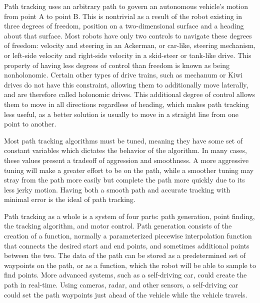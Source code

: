 \documentclass[12pt]{article}
\begin{document}
\begin{flushleft}
Path tracking uses an arbitrary path to govern an autonomous vehicle's motion from point A to point B. This is nontrivial as a result of the robot existing in three degrees of freedom, position on a two-dimensional surface and a heading about that surface. Most robots have only two controls to navigate these degrees of freedom: velocity and steering in an Ackerman, or car-like, steering mechanism, or left-side velocity and right-side velocity in a skid-steer or tank-like drive. This property of having less degrees of control than freedom is known as being nonholonomic. Certain other types of drive trains, such as mechanum or Kiwi drives do not have this constraint, allowing them to additionally move laterally, and are therefore called holonomic drives. This additional degree of control allows them to move in all directions regardless of heading, which makes path tracking less useful, as a better solution is usually to move in a straight line from one point to another.

Most path tracking algorithms must be tuned, meaning they have some set of constant variables which dictates the behavior of the algorithm. In many cases, these values present a tradeoff of aggression and smoothness. A more aggressive tuning will make a greater effort to be on the path, while a smoother tuning may stray from the path more easily but complete the path more quickly due to its less jerky motion. Having both a smooth path and accurate tracking with minimal error is the ideal of path tracking.

Path tracking as a whole is a system of four parts: path generation, point finding, the tracking algorithm, and motor control. Path generation consists of the creation of a function, normally a parameterized piecewise interpolation function that connects the desired start and end points, and sometimes additional points between the two. The data of the path can be stored as a predetermined set of waypoints on the path, or as a function, which the robot will be able to sample to find points. More advanced systems, such as a self-driving car, could create the path in real-time. Using cameras, radar, and other sensors, a self-driving car could set the path waypoints just ahead of the vehicle while the vehicle travels.


\end{flushleft}
\end{document}
